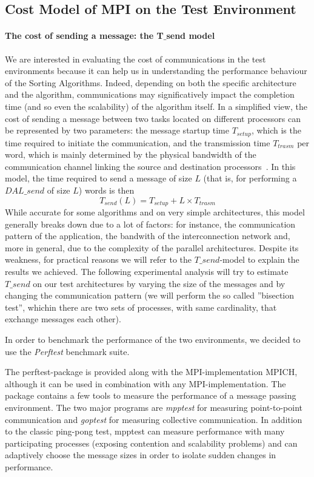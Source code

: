 \subsection{Cost Model of MPI on the Test Environment}
\label{MPI-cost-model}
\paragraph{The cost of sending a message: the T$\_$send model}
We are interested in evaluating the cost of communications in the test environments because it can help us in understanding the performance behaviour of the Sorting Algorithms. Indeed, depending on both the specific architecture and the algorithm, communications may significatively impact the completion time (and so even the scalability) of the algorithm itself. In a simplified view, the cost of sending a message between two tasks located on different processors can be represented by two parameters: the message startup time $T_{setup}$, which is the time required to initiate the communication, and the transmission time $T_{trasm}$ per word, which is mainly determined by the physical bandwidth of the communication channel linking the source and destination processors~\cite{VANN}. In this model, the time required to send a message of size $L$ (that is, for performing a $DAL\_send$ of size $L$) words is then
\[
T_{send}(L) = T_{setup} + L \times T_{trasm}
\]
While accurate for some algorithms and on very simple architectures, this model generally breaks down due to a lot of factors: for instance, the communication pattern of the application, the bandwith of the interconnection network and, more in general, due to the complexity of the parallel architectures. Despite its weakness, for practical reasons we will refer to the $T\_send$-model to explain the results we achieved.  
The following experimental analysis will try to estimate $T\_send$ on our test architectures by varying the size of the messages and by changing the communication pattern (we will perform the so called ''bisection test'', whichin there are two sets of processes, with same cardinality, that exchange messages each other). 

In order to benchmark the performance of the two environments, we decided to use the \textit{Perftest} benchmark suite.

The perftest-package is provided along with the MPI-implementation MPICH, although it can be used in combination with any MPI-implementation. The package contains a few tools to measure the performance of a message passing environment. The two major programs are \textit{mpptest} for measuring point-to-point communication and \textit{goptest} for measuring collective communication. In addition to the classic ping-pong test, mpptest can measure performance with many participating processes (exposing contention and scalability problems) and can adaptively choose the message sizes in order to isolate sudden changes in performance. 

